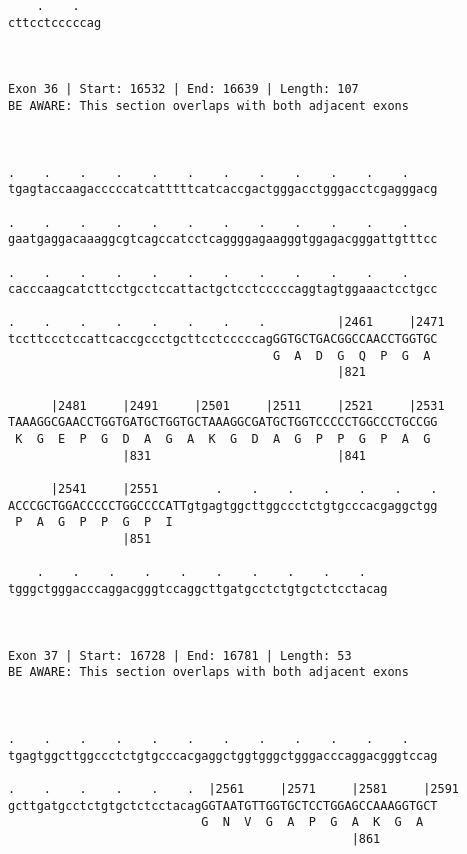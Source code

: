 \documentclass{article}
\begin{document}
\begin{Verbatim}
    .    .   
cttcctcccccag
             
             
 
Exon 36 | Start: 16532 | End: 16639 | Length: 107
BE AWARE: This section overlaps with both adjacent exons



.    .    .    .    .    .    .    .    .    .    .    .    
tgagtaccaagacccccatcatttttcatcaccgactgggacctgggacctcgagggacg
                                                            
.    .    .    .    .    .    .    .    .    .    .    .    
gaatgaggacaaaggcgtcagccatcctcaggggagaagggtggagacgggattgtttcc
                                                            
.    .    .    .    .    .    .    .    .    .    .    .    
cacccaagcatcttcctgcctccattactgctcctcccccaggtagtggaaactcctgcc
                                                            
.    .    .    .    .    .    .    .          |2461     |2471
tccttccctccattcaccgccctgcttcctcccccagGGTGCTGACGGCCAACCTGGTGC
                                     G  A  D  G  Q  P  G  A 
                                              |821          
  
      |2481     |2491     |2501     |2511     |2521     |2531
TAAAGGCGAACCTGGTGATGCTGGTGCTAAAGGCGATGCTGGTCCCCCTGGCCCTGCCGG
 K  G  E  P  G  D  A  G  A  K  G  D  A  G  P  P  G  P  A  G 
                |831                          |841          
  
      |2541     |2551        .    .    .    .    .    .    .
ACCCGCTGGACCCCCTGGCCCCATTgtgagtggcttggccctctgtgcccacgaggctgg
 P  A  G  P  P  G  P  I                                     
                |851                                        
  
    .    .    .    .    .    .    .    .    .    .   
tgggctgggacccaggacgggtccaggcttgatgcctctgtgctctcctacag
                                                     
                                                     
 
Exon 37 | Start: 16728 | End: 16781 | Length: 53
BE AWARE: This section overlaps with both adjacent exons



.    .    .    .    .    .    .    .    .    .    .    .    
tgagtggcttggccctctgtgcccacgaggctggtgggctgggacccaggacgggtccag
                                                            
.    .    .    .    .    .  |2561     |2571     |2581     |2591
gcttgatgcctctgtgctctcctacagGGTAATGTTGGTGCTCCTGGAGCCAAAGGTGCT
                           G  N  V  G  A  P  G  A  K  G  A  
                                                |861        
  

\end{Verbatim}
\end{document}
